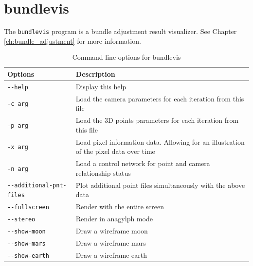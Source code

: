 \section{bundlevis}
\label{bundlevis}

The \texttt{bundlevis} program is a bundle adjustment result
visualizer.  See Chapter \ref{ch:bundle_adjustment} for more
information.

\begin{longtable}{|l|p{10cm}|}
\caption{Command-line options for bundlevis}
\label{tbl:bundlevis}
\endfirsthead
\endhead
\endfoot
\endlastfoot
\hline
Options & Description \\ \hline \hline
\verb#--help# & Display this help \\ \hline
\verb#-c arg# & Load the camera parameters for each iteration from this file \\ \hline
\verb#-p arg# & Load the 3D points parameters for each iteration from this file \\ \hline
\verb#-x arg# & Load pixel information data. Allowing for an illustration of the pixel data over time \\ \hline
\verb#-n arg# & Load a control network for point and camera relationship status \\ \hline
\verb#--additional-pnt-files# & Plot additional point files simultaneously with the above data \\ \hline
\verb#--fullscreen# & Render with the entire screen \\ \hline
\verb#--stereo# & Render in anagylph mode \\ \hline
\verb#--show-moon# & Draw a wireframe moon \\ \hline
\verb#--show-mars# & Draw a wireframe mars \\ \hline
\verb#--show-earth# & Draw a wireframe earth \\ \hline
\end{longtable}









